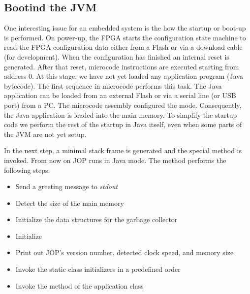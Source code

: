 \subsection{Bootind the JVM}

One interesting issue for an embedded system is the how the startup
or boot-up is performed. On power-up, the FPGA starts the
configuration state machine to read the FPGA configuration data
either from a Flash or via a download cable (for development). When
the configuration has finished an internal reset is generated. After
that reset, microcode instructions are executed starting from
address 0. At this stage, we have not yet loaded any application
program (Java bytecode). The first sequence in microcode performs
this task. The Java application can be loaded from an external Flash
or via a serial line (or USB port) from a PC. The microcode assembly
configured the mode. Consequently, the Java application is loaded
into the main memory. To simplify the startup code we perform the
rest of the startup in Java itself, even when some parts of the JVM
are not yet setup.

In the next step, a minimal stack frame is generated and the special
method  is invoked. From now on JOP runs in
Java mode. The method  performs the following steps:
\begin{samepage}
\begin{itemize}
    \item Send a greeting message to \emph{stdout}
    \item Detect the size of the main memory
    \item Initialize the data structures for the garbage collector
    \item Initialize 
    \item Print out JOP's version number, detected clock speed, and
    memory size
    \item Invoke the static class initializers in a predefined order
    \item Invoke the  method of the application class
\end{itemize}
\end{samepage}

